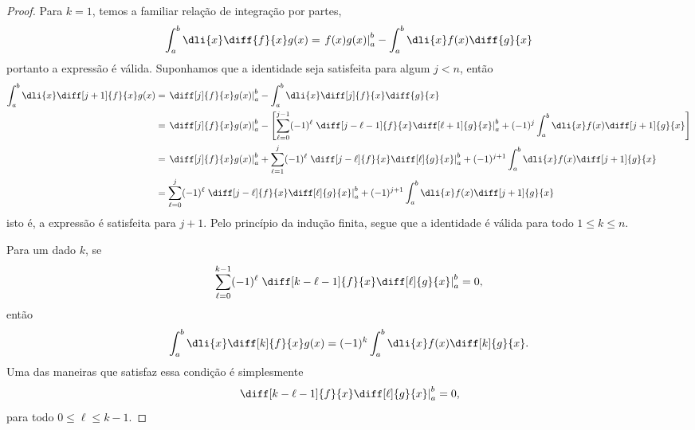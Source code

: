 \begin{proof}
    Para \(k = 1\), temos a familiar relação de integração por partes,
    \begin{equation*}
        \int_{a}^{b} \dli{x} \diff{f}{x}g(x) = \left.f(x)g(x)\right\rvert_{a}^{b} - \int_{a}^{b} \dli{x}f(x)\diff{g}{x}
    \end{equation*}
    portanto a expressão é válida. Suponhamos que a identidade seja satisfeita para algum \(j < n\), então
    \begin{align*}
        \int_{a}^{b} \dli{x} \diff[j+1]{f}{x}g(x) &= \left.\diff[j]{f}{x}g(x)\right\rvert_{a}^{b} - \int_{a}^{b}\dli{x} \diff[j]{f}{x}\diff{g}{x}\\
                                                  &= \left.\diff[j]{f}{x}g(x)\right\rvert_{a}^{b} -\left[\sum_{\ell = 0}^{j-1} (-1)^{\ell} \left.\diff[j-\ell-1]{f}{x}\diff[\ell+1]{g}{x}\right\rvert_a^b + (-1)^{j} \int_{a}^{b}\dli{x} f(x)\diff[j+1]{g}{x}\right]\\
                                                  &= \left.\diff[j]{f}{x}g(x)\right\rvert_{a}^{b} +\sum_{\ell = 1}^{j} (-1)^{\ell} \left.\diff[j-\ell]{f}{x}\diff[\ell]{g}{x}\right\rvert_a^b + (-1)^{j+1} \int_{a}^{b}\dli{x} f(x)\diff[j+1]{g}{x}\\
                                                  &= \sum_{\ell = 0}^{j} (-1)^{\ell} \left.\diff[j-\ell]{f}{x}\diff[\ell]{g}{x}\right\rvert_a^b + (-1)^{j+1} \int_{a}^{b}\dli{x} f(x)\diff[j+1]{g}{x}
    \end{align*}
    isto é, a expressão é satisfeita para \(j + 1\). Pelo princípio da indução finita, segue que a identidade é válida para todo \(1 \leq k \leq n\).

    Para um dado \(k\), se
    \begin{equation*}
        \sum_{\ell = 0}^{k-1} (-1)^{\ell} \left.\diff[k-\ell-1]{f}{x}\diff[\ell]{g}{x}\right\rvert_a^b = 0,
    \end{equation*}
    então
    \begin{equation*}
        \int_{a}^{b} \dli{x} \diff[k]{f}{x}g(x) = (-1)^k \int_{a}^{b}\dli{x} f(x)\diff[k]{g}{x}.
    \end{equation*}
    Uma das maneiras que satisfaz essa condição é simplesmente
    \begin{equation*}
        \left.\diff[k-\ell-1]{f}{x}\diff[\ell]{g}{x}\right\rvert_a^b = 0,
    \end{equation*}
    para todo \(0 \leq \ell \leq k - 1\).
\end{proof}

